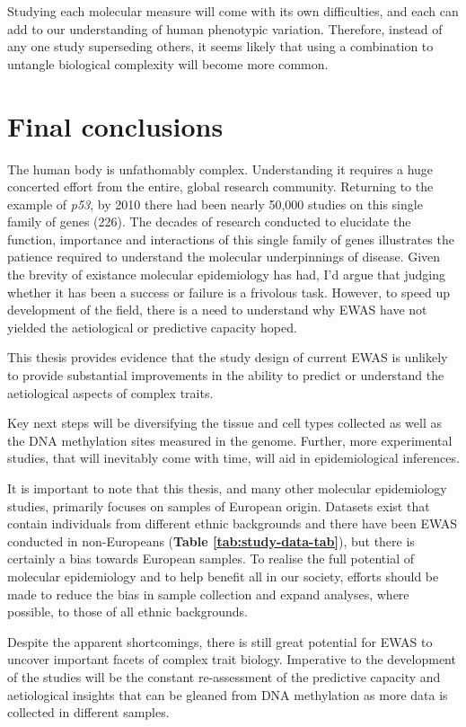 \documentclass[11pt,oneside]{bristolthesis}
\begin{document}
Studying each molecular measure will come with its own difficulties, and each can add to our understanding of human phenotypic variation. Therefore, instead of any one study superseding others, it seems likely that using a combination to untangle biological complexity will become more common.

\hypertarget{final-conclusions}{%
\section{Final conclusions}\label{final-conclusions}}

The human body is unfathomably complex. Understanding it requires a huge concerted effort from the entire, global research community. Returning to the example of \emph{p53}, by 2010 there had been nearly 50,000 studies on this single family of genes (226). The decades of research conducted to elucidate the function, importance and interactions of this single family of genes illustrates the patience required to understand the molecular underpinnings of disease. Given the brevity of existance molecular epidemiology has had, I'd argue that judging whether it has been a success or failure is a frivolous task. However, to speed up development of the field, there is a need to understand why EWAS have not yielded the aetiological or predictive capacity hoped.

This thesis provides evidence that the study design of current EWAS is unlikely to provide substantial improvements in the ability to predict or understand the aetiological aspects of complex traits.

Key next steps will be diversifying the tissue and cell types collected as well as the DNA methylation sites measured in the genome. Further, more experimental studies, that will inevitably come with time, will aid in epidemiological inferences.

It is important to note that this thesis, and many other molecular epidemiology studies, primarily focuses on samples of European origin. Datasets exist that contain individuals from different ethnic backgrounds and there have been EWAS conducted in non-Europeans (\textbf{Table \ref{tab:study-data-tab}}), but there is certainly a bias towards European samples. To realise the full potential of molecular epidemiology and to help benefit all in our society, efforts should be made to reduce the bias in sample collection and expand analyses, where possible, to those of all ethnic backgrounds.

Despite the apparent shortcomings, there is still great potential for EWAS to uncover important facets of complex trait biology. Imperative to the development of the studies will be the constant re-assessment of the predictive capacity and aetiological insights that can be gleaned from DNA methylation as more data is collected in different samples.
\end{document}

